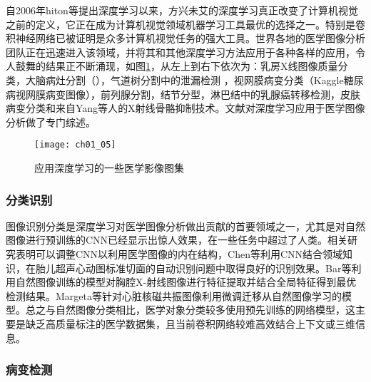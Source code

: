 自2006年hiton等\citep{Hinton2006a}提出深度学习以来，方兴未艾的深度学习真正改变了计算机视觉之前的定义，它正在成为计算机视觉领域机器学习工具最优的选择之一。特别是卷积神经网络已被证明是众多计算机视觉任务的强大工具。世界各地的医学图像分析团队正在迅速进入该领域，并将其和其他深度学习方法应用于各种各样的应用，令人鼓舞的结果正不断涌现，如图\ref{fig:ch01_05}，从左上到右下依次为：乳房X线图像质量分类\citep{Sickles2006Use}，大脑病灶分割（\citep{Abr2016Improved}），气道树分割中的泄漏检测 \citep{Charbonnier2016Improving}，视网膜病变分类（Kaggle糖尿病视网膜病变图像）\citep{Grinsven2016Fast}，前列腺分割，结节分型，淋巴结中的乳腺癌转移检测，皮肤病变分类\citep{Esteva2017Dermatologist}和来自Yang等人\citep{Yang2016Cascade}的X射线骨骼抑制技术。文献\citep{Litjens2017Asurvey,Shen2017a,Greenspan2016}对深度学习应用于医学图像分析做了专门综述。

\begin{figure}[!htbp]
    \centering
    \texttt{[image: ch01\_05]}
   \caption{应用深度学习的一些医学影像图集}
   \label{fig:ch01_05}
\end{figure}

\subsubsection{分类识别}

图像识别分类是深度学习对医学图像分析做出贡献的首要领域之一，尤其是对自然图像进行预训练的CNN已经显示出惊人效果，在一些任务中超过了人类。相关研究表明可以调整CNN以利用医学图像的内在结构，Chen等\citep{Chen2015}利用CNN结合领域知识，在胎儿超声心动图标准切面的自动识别问题中取得良好的识别效果。Bar等\citep{Bar2015Chest}利用自然图像训练的模型对胸腔X-射线图像进行特征提取并结合全局特征\citep{Oliva2001}得到最优检测结果。Margeta等\citep{Margeta2015}针对心脏核磁共振图像利用微调迁移从自然图像学习的模型。总之与自然图像分类相比，医学对象分类较多使用预先训练的网络模型，这主要是缺乏高质量标注的医学数据集，且当前卷积网络较难高效结合上下文或三维信息。

\subsubsection{病变检测} 


